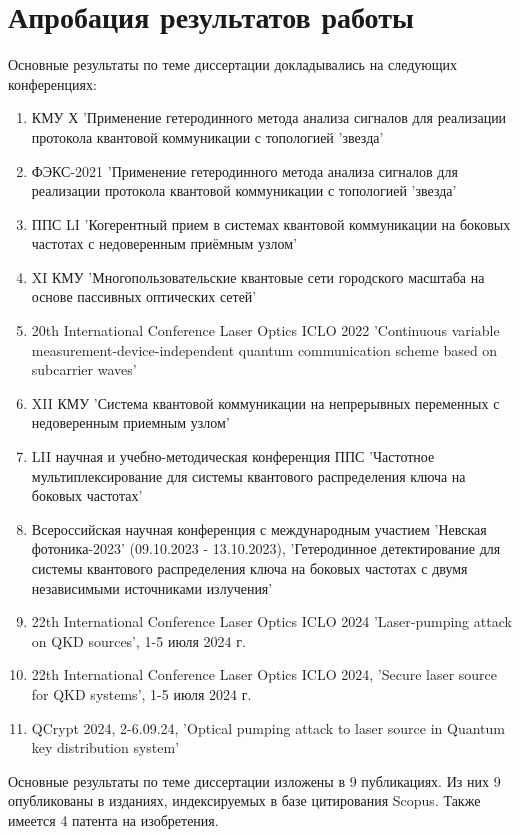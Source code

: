 \section*{Апробация результатов работы}
Основные результаты по теме диссертации докладывались на следующих конференциях:
\begin{enumerate}
    \item КМУ Х 'Применение гетеродинного метода анализа сигналов для реализации протокола квантовой коммуникации с топологией 'звезда'
    \item ФЭКС-2021 'Применение гетеродинного метода анализа сигналов для реализации протокола квантовой коммуникации с топологией 'звезда'
    \item ППС LI 'Когерентный прием в системах квантовой коммуникации на боковых частотах с недоверенным приёмным узлом'
    \item XI КМУ 'Многопользовательские квантовые сети городского масштаба на основе пассивных оптических сетей'
    \item 20th International Conference Laser Optics ICLO 2022 'Continuous variable measurement-device-independent quantum communication scheme based on subcarrier waves'
    \item XII КМУ 'Система квантовой коммуникации на непрерывных переменных с недоверенным приемным узлом'
    \item LII научная и учебно-методическая конференция ППС 'Частотное мультиплексирование для системы квантового распределения ключа на боковых частотах'
    \item Всероссийская научная конференция с международным участием 'Невская фотоника-2023' (09.10.2023 - 13.10.2023), 'Гетеродинное детектирование для системы квантового распределения ключа на боковых частотах с двумя независимыми источниками излучения'
    \item 22th International Conference Laser Optics ICLO 2024 'Laser-pumping attack on QKD sources', 1-5 июля 2024 г.
    \item 22th International Conference Laser Optics ICLO 2024, 'Secure laser source for QKD systems', 1-5 июля 2024 г.
    \item QCrypt 2024, 2-6.09.24, 'Optical pumping attack to laser source in Quantum key distribution system'
\end{enumerate}
Основные результаты по теме диссертации изложены в 9 публикациях. Из них 9 опубликованы в изданиях, индексируемых в базе цитирования Scopus. Также имеется 4 патента на изобретения.\\



